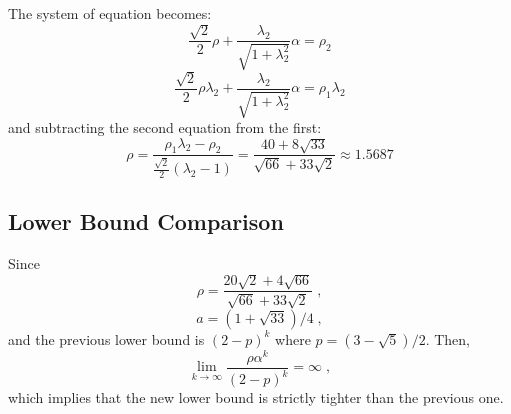 The system of equation becomes:
$$\frac{\sqrt{2}}{2}\rho+\frac{\lambda_2}{\sqrt{1+\lambda_2^2}}\alpha = \rho_2 $$
$$\frac{\sqrt{2}}{2}\rho\lambda_2+\frac{\lambda_2}{\sqrt{1+\lambda_2^2}}\alpha = \rho_1\lambda_2$$
and subtracting the second equation from the first:
$$\rho=\frac{\rho_1\lambda_2-\rho_2}{\frac{\sqrt{2}}{2}(\lambda_2-1)}=\frac{40+8\sqrt{33}}{\sqrt{66}+33\sqrt{2}}\approx1.5687$$

\subsection{Lower Bound Comparison}
Since
$$\rho = \frac{20 \sqrt{2} + 4 \sqrt{66}}{\sqrt{66} + 33 \sqrt{2}}\;,$$
$$a = (1 + \sqrt{33}) / 4\;,$$
and the previous lower bound is $(2-p)^k$ where $p = (3-\sqrt{5})/2$. 
Then,
$$\lim_{k \rightarrow \infty} \frac{\rho\alpha^k}{(2 - p)^k} = \infty\;,$$
which implies that the new lower bound is strictly tighter than the previous one.

